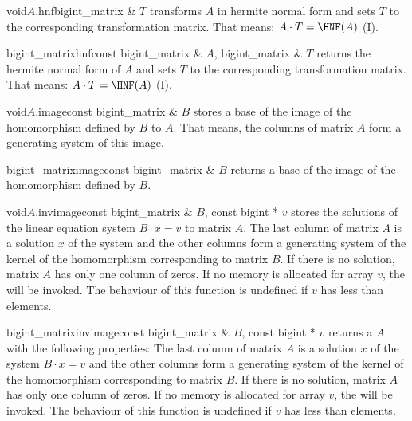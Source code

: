 {\begin{fcode}{void}{$A$.hnf}{bigint_matrix & $T$}
  transforms $A$ in hermite normal form and sets $T$ to the corresponding transformation matrix.
  That means: $A \cdot T = \HNF(A)$ (I).
\end{fcode}

\begin{fcode}{bigint_matrix}{hnf}{const bigint_matrix & $A$, bigint_matrix & $T$}
  returns the hermite normal form of $A$ and sets $T$ to the corresponding transformation
  matrix.  That means: $A \cdot T = \HNF(A)$ (I).
\end{fcode}

\begin{fcode}{void}{$A$.image}{const bigint_matrix & $B$}
  stores a base of the image of the homomorphism defined by $B$ to $A$.  That means, the columns
  of matrix $A$ form a generating system of this image.
\end{fcode}

\begin{fcode}{bigint_matrix}{image}{const bigint_matrix & $B$}
  returns a base of the image of the homomorphism defined by $B$.
\end{fcode}

\begin{fcode}{void}{$A$.invimage}{const bigint_matrix & $B$, const bigint * $v$}
  stores the solutions of the linear equation system $B \cdot x = v$ to matrix $A$.  The last
  column of matrix $A$ is a solution $x$ of the system and the other columns form a generating
  system of the kernel of the homomorphism corresponding to matrix $B$.  If there is no
  solution, matrix $A$ has only one column of zeros.  If no memory is allocated for array $v$,
  the \LEH will be invoked.  The behaviour of this function is undefined if $v$ has less than
   elements.
\end{fcode}

\begin{fcode}{bigint_matrix}{invimage}{const bigint_matrix & $B$, const bigint * $v$}
  returns a  $A$ with the following properties: The last column of matrix
  $A$ is a solution $x$ of the system $B \cdot x = v$ and the other columns form a generating
  system of the kernel of the homomorphism corresponding to matrix $B$.  If there is no
  solution, matrix $A$ has only one column of zeros.  If no memory is allocated for array $v$,
  the \LEH will be invoked.  The behaviour of this function is undefined if $v$ has less than
   elements.
\end{fcode}

}
